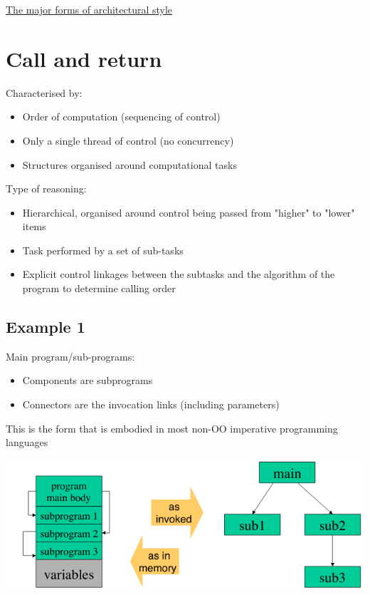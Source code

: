 \documentclass{article}[18pt]
\begin{document}
\begin{center}
\underline{\huge The major forms of architectural style}
\end{center}
\section{Call and return}
Characterised by:
\begin{itemize}
	\item Order of computation (sequencing of control)
	\item Only a single thread of control (no concurrency)
	\item Structures organised around computational tasks
\end{itemize}
Type of reasoning:
\begin{itemize}
	\item Hierarchical, organised around control being passed from "higher" to "lower" items
	\item Task performed by a set of sub-tasks
	\item Explicit control linkages between the subtasks and the algorithm of the program to determine calling order
\end{itemize}
\subsection{Example 1}
Main program/sub-programs:
\begin{itemize}
	\item Components are subprograms
	\item Connectors are the invocation links (including parameters)
\end{itemize}
This is the form that is embodied in most non-OO imperative programming languages
\begin{center}
	\includegraphics[scale=0.7]{"Call and Return"}
\end{center}
\end{document}
